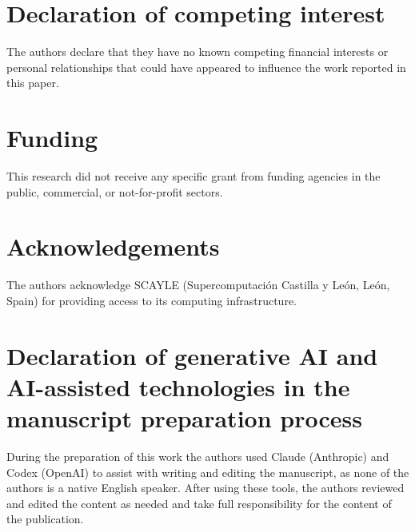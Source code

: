 \documentclass[preprint,12pt]{elsarticle}
\begin{document}
\section*{Declaration of competing interest}
The authors declare that they have no known competing financial interests or personal
relationships that could have appeared to influence the work reported in this paper.

\section*{Funding}
This research did not receive any specific grant from funding agencies in the public, commercial,
or not-for-profit sectors.

\section*{Acknowledgements}
The authors acknowledge SCAYLE (Supercomputaci\'on Castilla y Le\'on, Le\'on, Spain) for
providing access to its computing infrastructure.

\section*{Declaration of generative AI and AI-assisted technologies in the manuscript preparation process}
During the preparation of this work the authors used Claude (Anthropic) and Codex (OpenAI) to assist with
writing and editing the manuscript, as none of the authors is a native English speaker. After
using these tools, the authors reviewed and edited the content as needed and take full
responsibility for the content of the publication.



\end{document}
